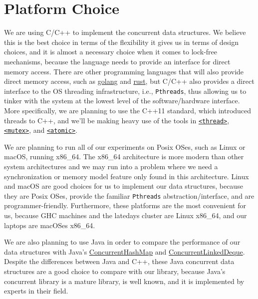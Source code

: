 \documentclass[11pt]{article}
\begin{document}
\section*{Platform Choice}
We are using C/C++ to implement the concurrent data structures. We believe this
is the best choice in terms of the flexibility it gives us in terms of design
choices, and it is almost a necessary choice when it comes to lock-free
mechanisms, because the language needs to provide an interface for direct memory
access. There are other programming languages that will also provide direct
memory access, such as \href{https://golang.org/}{golang} and
\href{https://www.rust-lang.org/en-US/}{rust}, but C/C++ also provides a direct
interface to the OS threading infrastructure, i.e., \texttt{Pthreads}, thus
allowing us to tinker with the system at the lowest level of the software/hardware
interface. More specifically, we are planning to use the C++11 standard, which
introduced threads to C++, and we'll be making heavy use of the tools in
\href{http://en.cppreference.com/w/cpp/header/thread}{\texttt{<thread>}},
\href{http://en.cppreference.com/w/cpp/header/mutex}{\texttt{<mutex>}}, and
\href{http://en.cppreference.com/w/cpp/header/atomic}{\texttt{<atomic>}}.

We are planning to run all of our experiments on Posix OSes, such as Linux or
macOS, running x86\_64. The x86\_64 architecture is more modern than other
system architectures and we may run into a problem where we need a
synchronization or memory model feature only found in this architecture. Linux
and macOS are good choices for us to implement our data structures, because they
are Posix OSes, provide the familiar \texttt{Pthreads} abstraction/interface,
and are programmer-friendly. Furthermore, these platforms are the most
convenient for us, because GHC machines and the latedays cluster are Linux
x86\_64, and our laptops are macOSes x86\_64.

We are also planning to use Java in order to compare the performance of our data structures with Java's
\href{https://docs.oracle.com/javase/8/docs/api/java/util/concurrent/ConcurrentHashMap.html}{ConcurrentHashMap} and
\href{https://docs.oracle.com/javase/8/docs/api/java/util/concurrent/ConcurrentLinkedDeque.html}{ConcurrentLinkedDeque}.
Despite the differences between Java and C++, these Java concurrent data
structures are a good choice to compare with our library, because Java's
concurrent library is a mature library, is well known, and it is implemented by
experts in their field.
\end{document}
